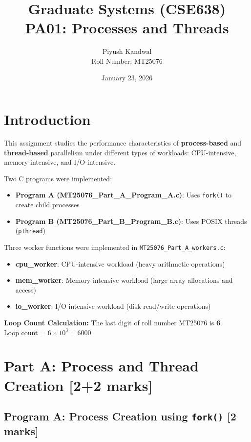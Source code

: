 \documentclass[12pt,a4paper]{article}
\title{\textbf{Graduate Systems (CSE638)}\\
\vspace{0.3cm}
\large PA01: Processes and Threads}
\author{
Piyush Kandwal \\
Roll Number: MT25076
}
\date{January 23, 2026}
\begin{document}
\maketitle
\thispagestyle{empty}
\newpage

\tableofcontents
\newpage

\section{Introduction}

This assignment studies the performance characteristics of \textbf{process-based}
and \textbf{thread-based} parallelism under different types of workloads:
CPU-intensive, memory-intensive, and I/O-intensive.

Two C programs were implemented:
\begin{itemize}
    \item \textbf{Program A (MT25076\_Part\_A\_Program\_A.c)}: Uses \texttt{fork()} to create child processes
    \item \textbf{Program B (MT25076\_Part\_B\_Program\_B.c)}: Uses POSIX threads (\texttt{pthread})
\end{itemize}

Three worker functions were implemented in \texttt{MT25076\_Part\_A\_workers.c}:
\begin{itemize}
    \item \textbf{cpu\_worker}: CPU-intensive workload (heavy arithmetic operations)
    \item \textbf{mem\_worker}: Memory-intensive workload (large array allocations and access)
    \item \textbf{io\_worker}: I/O-intensive workload (disk read/write operations)
\end{itemize}

\textbf{Loop Count Calculation:} The last digit of roll number MT25076 is \textbf{6}.\\
Loop count = $6 \times 10^3 = 6000$

\section{Part A: Process and Thread Creation [2+2 marks]}

\subsection{Program A: Process Creation using \texttt{fork()} [2 marks]}
\end{document}
